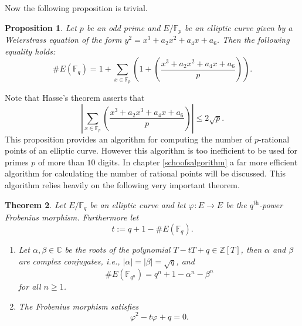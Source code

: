 \documentclass{article}
\numberwithin{equation}{section}
\newtheorem{theorem}{Theorem}[subsection]
\newtheorem{proposition}[theorem]{Proposition}
\theoremstyle{definition}
\newcommand{\CC}{{\mathbb C}} %
\newcommand{\ZZ}{{\mathbb Z}} %
\newcommand{\FF}[1]{{\mathbb F}_{#1}} %
\newcommand{\frob}[1][]{\varphi_{#1}} %
\newcommand{\leg}[2]{\left( \frac{#1}{#2}\right)} %
\begin{document}
Now the following proposition is trivial. 

\begin{proposition}\label{ptcountingLS}
Let $p$ be an odd prime and $E/\FF{p}$ be an elliptic curve given by a Weierstrass equation of the form $y^2=x^3+a_2x^2+a_4x+a_6$. Then the following equality holds: $$\#E(\FF{q})=1+\sum_{x \in \FF{p}} \left(1+\leg{x^3+a_2x^2+a_4x+a_6}{p}\right).$$
\end{proposition}

Note that Hasse's theorem asserts that $$\left | \sum_{x \in \FF{p}} \leg{x^3+a_2x^3+a_4x+a_6}{p} \right | \leq 2 \sqrt{p}.$$
This proposition provides an algorithm for computing the number of $p$-rational points of an elliptic curve. However this algorithm is too inefficient to be used for primes $p$ of more than $10$ digits. In chapter \ref{schoofsalgorithm} a far more efficient algorithm for calculating the number of rational points will be discussed. This algorithm relies heavily on the following very important theorem.

\begin{theorem}\label{frobtrace}
Let $E/\FF{q}$ be an elliptic curve and let $\frob:E \rightarrow E$ be the $q^\text{th}$-power Frobenius morphism. Furthermore let $$t:=q+1-\#E(\FF{q}).$$ 
\begin{enumerate}
\item Let $\alpha,\beta \in \CC$ be the roots of the polynomial $T-tT+q \in \ZZ[T]$, then $\alpha$ and $\beta$ are complex conjugates, i.e., $|\alpha|=|\beta|=\sqrt{q}$, and $$\#E(\FF{q^n})=q^n+1-\alpha^n-\beta^n$$ for all $n \geq 1$.
\item The Frobenius morphism satisfies $$\frob^2-t\frob+q=0.$$
\end{enumerate}
\end{theorem}
\end{document}
